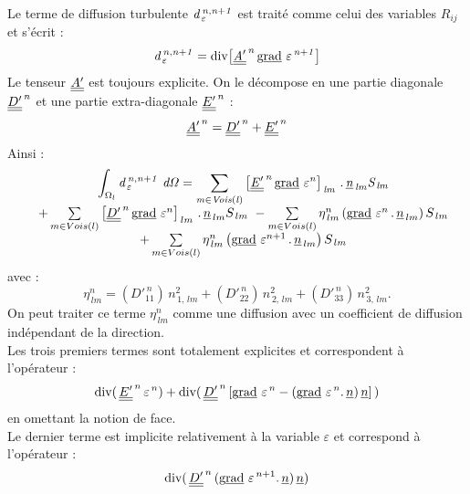 Le terme de diffusion turbulente $\it{d}^{\,n,n+1}_{\,\varepsilon}$ est trait\'e comme celui des
variables $R_{ij}$ et s'\'ecrit : $$\it{d}_{\,\varepsilon}^{\,n,n+1} = \text{div}{\left[
\underline{\underline{A'}}^{\,n}\,\text{g}\underline{\text{rad}}\ {\varepsilon^{\,n+1}} \right]}$$
Le tenseur $\underline{\underline{A'}}$ est toujours explicite.
On le d\'ecompose en une partie diagonale $\underline{\underline{D'}}^{\,n}$ et une partie
extra-diagonale $\underline{\underline{E'}}^{\,n}$ :\\
$$\underline{\underline{A'}}^{\,n} =\underline{\underline{D'}}^{\,n} + \underline{\underline{E'}}^{\,n}$$
Ainsi :
\begin{equation}
\begin{array} {lcl}
&\displaystyle \int_{\Omega_l} \it{d}_{\,\varepsilon}^{\,n,n+1}\ d\Omega =
\sum\limits_{m\in Vois(l)} \left[
\tens{E'}^{\,n}\,\grad{\varepsilon}^n
\right]_{\,lm}\,.\,\vect{n}_{\,lm}S_{\,lm}\\
& + \sum\limits_{m\in Vois(l)} \left[
\tens{D'}^{\,n}\,\grad{\varepsilon}^n
\right]_{\,lm}\,.\,\vect{n}_{\,lm}S_{\,lm}\
- \sum\limits_{m\in Vois(l)}
 \eta^n_{\,lm} \left(\grad{\varepsilon}^{n}\,.\,\vect{n}_{\,lm} \right) S_{\,lm}\\
&+  \sum\limits_{m\in Vois(l)} \eta^n_{\,lm} \left( \grad{\varepsilon}^{n+1}\,.\,\vect{n}_{\,lm} \right) S_{\,lm}
\end{array}
\end{equation}
avec :
$$\eta^n_{\,lm} = (D'^{\,n}_{11})\,n^2_{\,1,\,lm} + (D'^{\,n}_{22})\,n^2_{\,2,\,lm} +
(D'^{\,n}_{33})\,n^2_{\,3,\,lm}.$$
On peut traiter ce terme $\eta^n_{\,lm}$ comme une diffusion avec un coefficient de diffusion ind\'ependant de la direction.\\
Les trois premiers termes sont totalement explicites et correspondent \`a l'op\'erateur :
$$\text{div} (\,\underline{\underline{E'}}^{\,n}\,\varepsilon^{\,n}) +
\text{div} (\,\underline{\underline{D'}}^{\,n}\,[\text{g}\underline{\text{rad}}\ {\varepsilon^{\,n}} - (\text{g}\underline{\text{rad}}\ {\varepsilon^{\,n}}.\,\underline{n})\,\underline{n}]\,)$$ en omettant la notion de face.\\
Le dernier terme est implicite relativement \`a la variable $\varepsilon$ et correspond \`a l'op\'erateur :
 $$\text{div} (\,\underline{\underline{D'}}^{\,n}\,(\text{g}\underline{\text{rad}}\ {\varepsilon^{\,n+1}}.\,\underline{n} )\,\underline{n})$$

